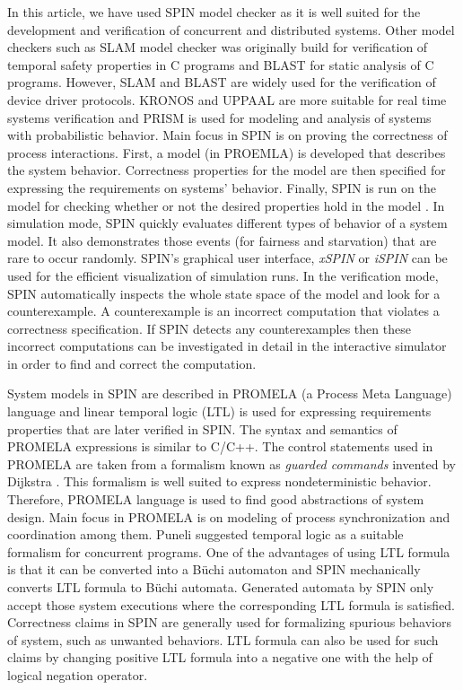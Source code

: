 \documentclass[conference]{IEEEtran}
\begin{document}
In this article, we have used SPIN \cite{7} model checker as it is well suited for the development and verification of concurrent and distributed 
systems. Other model checkers such as SLAM \cite{10} model checker was originally build for verification of temporal safety properties in C programs
and BLAST \cite{4} for static analysis of C programs. However, SLAM and BLAST are widely used for the verification of device driver protocols.
KRONOS \cite{11} and UPPAAL \cite{12} are more suitable for real time systems verification and PRISM \cite{15} is used for modeling and analysis of 
systems with probabilistic behavior. Main focus in SPIN is on proving the correctness of process interactions. First, a model (in PROEMLA) 
is developed that describes the system behavior. Correctness properties for the model are then specified for expressing the requirements on systems’ 
behavior. Finally, SPIN is run on the model for checking whether or not the desired properties hold in the model \cite{17}. In simulation mode, 
SPIN quickly evaluates different types of behavior of a system model. It also demonstrates those events (for fairness and starvation) that are 
rare to occur randomly. SPIN's graphical user interface, \textit{xSPIN} or \textit{iSPIN} can be used for the efficient visualization of 
simulation runs. In the verification mode, SPIN automatically inspects the whole state space of the model and look for a counterexample. 
A counterexample is an incorrect computation that violates a correctness specification. If SPIN detects any counterexamples then these incorrect 
computations can be investigated in detail in the interactive simulator in order to find and correct the computation. 

System models in SPIN are described in PROMELA (a Process Meta Language) language \cite{17} and linear temporal logic (LTL) is used for expressing 
requirements properties that are later verified in SPIN. The syntax and semantics of PROMELA expressions is similar to C/C++. The control statements
used in PROMELA are taken from a formalism known as \textit{guarded commands} invented by Dijkstra \cite{23}. This formalism is well suited to 
express nondeterministic behavior. Therefore, PROMELA language is used to find good abstractions of system design. Main focus in PROMELA is on 
modeling of process synchronization and coordination among them. Puneli \cite{16} suggested temporal logic as a suitable formalism for concurrent 
programs. One of the advantages of using LTL formula is that it can be converted into a B\"{u}chi automaton \cite{24} and SPIN mechanically converts
LTL formula to B\"{u}chi automata. Generated automata by SPIN only accept those system executions where the corresponding LTL formula is 
satisfied. Correctness claims in SPIN are generally used for formalizing spurious behaviors of system, such as unwanted behaviors. 
LTL formula can also be used for such claims by changing positive LTL formula into a negative one with the help of logical negation operator.
\end{document}
